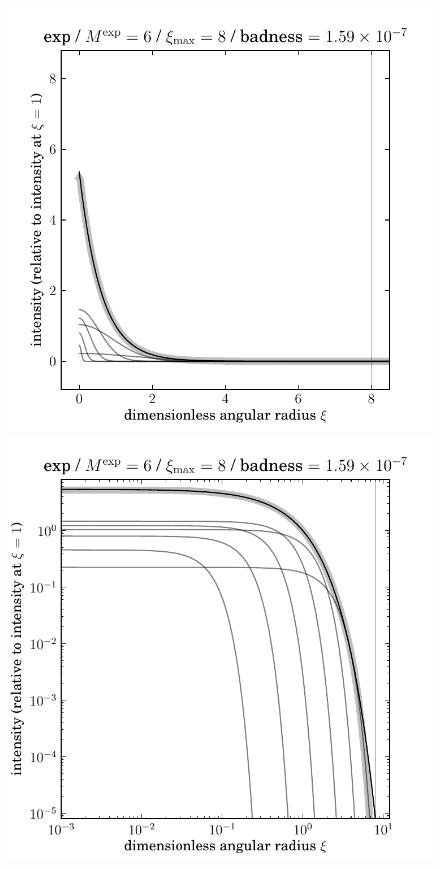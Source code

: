 \documentclass[12pt,pdftex,preprint]{aastex}
\newlength{\figurewidth}
\begin{document}
\clearpage
\begin{figure}
\includegraphics[width=\figurewidth]{exp_K06_MR08_profile.pdf}%
\includegraphics[width=\figurewidth]{exp_K06_MR08_profile_log.pdf}\\

\end{figure}
\end{document}
